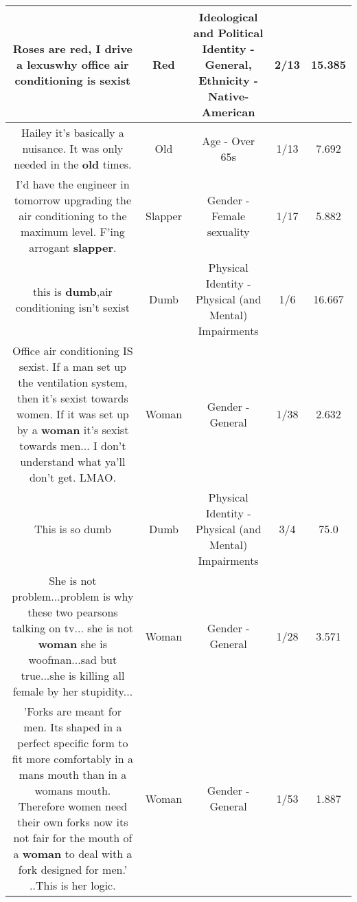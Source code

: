 \documentclass[11pt]{article}
\newlength\mylength
\begin{document}
\begin{center}
\begin{longtable}{|C{.65\mylength}|C{.30\mylength}|C{.12\mylength}|C{.12\mylength}|C{.12\mylength}|}
  \small Roses are \textbf{r\textbf{ed}}, I drive a lexuswhy office air conditioning is sexist\normalsize   & Red &  Ideological and Political Identity - General, Ethnicity - Native-American & 2/13 & 15.385 \\  \hline
  \small Hailey it's basically a nuisance. It was only needed in the \textbf{old} times.\normalsize   & Old & Age - Over 65s & 1/13 & 7.692 \\  \hline
  \small I'd have the engineer in tomorrow upgrading the air conditioning to the maximum level. F'ing arrogant \textbf{slapper}.\normalsize   & Slapper & Gender - Female sexuality & 1/17 & 5.882 \\  \hline
  \small this is \textbf{dumb},air conditioning isn't sexist\normalsize   & Dumb & Physical Identity - Physical (and Mental) Impairments & 1/6 & 16.667 \\  \hline
  \small Office air conditioning IS sexist. If a man set up the ventilation system, then it's sexist towards women. If it was set up by a \textbf{woman} it's sexist towards men... I don't understand what ya'll don't get. LMAO.\normalsize   & Woman & Gender - General & 1/38 & 2.632 \\  \hline
  \small This is so dumb\normalsize   & Dumb & Physical Identity - Physical (and Mental) Impairments & 3/4 & 75.0 \\  \hline
  \small She is not problem...problem is why these two pearsons talking on tv... she is not \textbf{woman} she is woofman...sad but true...she is killing all female by her stupidity...\normalsize   & Woman & Gender - General & 1/28 & 3.571 \\  \hline
  \small 'Forks are meant for men. Its shaped in a perfect specific form to fit more comfortably in a mans mouth than in a womans mouth. Therefore women need their own forks now its not fair for the mouth of a \textbf{woman} to deal with a fork designed for men.' ..This is her logic.\normalsize   & Woman & Gender - General & 1/53 & 1.887 \\  \hline

\end{longtable}
\end{center}
\end{document}
